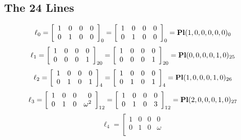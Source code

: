 \documentclass{article}
\begin{document}
{\subsection*{The 24 Lines}
$$
\ell_{0} = 
\left[
\begin{array}{*{4}{r}}
1 & 0 & 0 & 0\\
0 & 1 & 0 & 0\\
\end{array}
\right]
_{0}
=
\left[
\begin{array}{*{4}c}
1  & 0  & 0  & 0\\
0  & 1  & 0  & 0\\
\end{array}
\right]_{0}
={\rm\bf Pl}(1,0,0,0,0,0 )_{0}$$
$$
\ell_{1} = 
\left[
\begin{array}{*{4}{r}}
1 & 0 & 0 & 0\\
0 & 0 & 0 & 1\\
\end{array}
\right]
_{20}
=
\left[
\begin{array}{*{4}c}
1  & 0  & 0  & 0\\
0  & 0  & 0  & 1\\
\end{array}
\right]_{20}
={\rm\bf Pl}(0,0,0,0,1,0 )_{25}$$
$$
\ell_{2} = 
\left[
\begin{array}{*{4}{r}}
1 & 0 & 0 & 0\\
0 & 1 & 0 & 1\\
\end{array}
\right]
_{4}
=
\left[
\begin{array}{*{4}c}
1  & 0  & 0  & 0\\
0  & 1  & 0  & 1\\
\end{array}
\right]_{4}
={\rm\bf Pl}(1,0,0,0,1,0 )_{26}$$
$$
\ell_{3} = 
\left[
\begin{array}{*{4}{r}}
1 & 0 & 0 & 0\\
0 & 1 & 0 & \omega^{2}\\
\end{array}
\right]
_{12}
=
\left[
\begin{array}{*{4}c}
1  & 0  & 0  & 0\\
0  & 1  & 0  & 3\\
\end{array}
\right]_{12}
={\rm\bf Pl}(2,0,0,0,1,0 )_{27}$$
$$
\ell_{4} = 
\left[
\begin{array}{*{4}{r}}
1 & 0 & 0 & 0\\
0 & 1 & 0 & \omega \\
\end{array}
$$}
\end{document}
